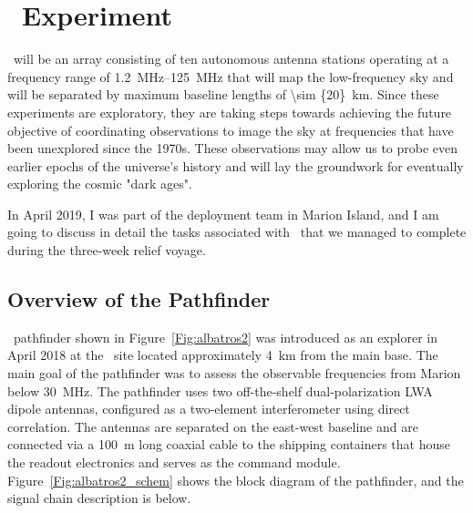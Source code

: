 \chapter{\albatros~Experiment}

\albatros\ will be an array consisting of ten autonomous antenna stations operating at a frequency range of \SIrange{1.2}{125}{\mega\hertz} that will map the low-frequency sky and will be separated by maximum baseline lengths of \SI{\sim {20}}{km}. Since these experiments are exploratory, they are taking steps towards achieving the future objective of coordinating observations to image the sky at frequencies that have been unexplored since the 1970s. These observations may allow us to probe even earlier epochs of the universe's history and will lay the groundwork for eventually exploring the cosmic "dark ages".

In April 2019, I was part of the deployment team in Marion Island, and I am going to discuss in detail the tasks associated with \albatros\ that we managed to complete during the three-week relief voyage.  

\section{Overview of the Pathfinder}\label{s:pathfinder}

\albatros\ pathfinder shown in Figure~\ref{Fig:albatros2} was introduced as an explorer in April 2018 at the \prizm\ site located approximately \SI{4}{\kilo \meter} from the main base. The main goal of the pathfinder was to assess the observable frequencies from Marion below 30~MHz. The pathfinder uses two off-the-shelf dual-polarization LWA dipole antennas, configured as a two-element interferometer using direct correlation. The antennas are separated on the east-west baseline and are connected via a \SI{100}{\meter} long coaxial cable to the shipping containers that house the readout electronics and serves as the command module. Figure~\ref{Fig:albatros2_schem} shows the block diagram of the pathfinder, and the signal chain description is below.

